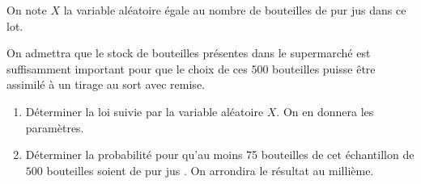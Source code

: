 \documentclass[12pt,french]{article}
\begin{document}
\begin{question}[subtitle={Antilles Guyane septembre 2015}]
On note $X$ la variable aléatoire égale au nombre de bouteilles de \og pur jus \fg{} dans ce lot.

On admettra que le stock de bouteilles présentes dans le supermarché est suffisamment important pour que le choix de ces $500$ bouteilles puisse être assimilé à un tirage au sort avec remise.

\medskip

\begin{enumerate}
\item Déterminer la loi suivie par la variable aléatoire $X$. On en donnera les paramètres.
\item Déterminer la probabilité pour qu'au moins 75 bouteilles de cet échantillon de $500$ bouteilles soient de \og pur jus \fg. On arrondira le résultat au millième.
\end{enumerate}

\bigskip

\end{question}
\end{document}
